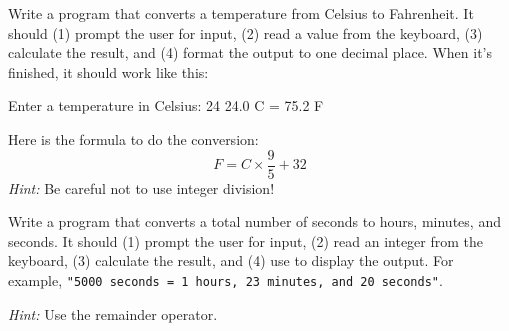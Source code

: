 

\begin{exercise}  %

Write a program that converts a temperature from Celsius to Fahrenheit.
It should (1) prompt the user for input, (2) read a  value from the keyboard, (3) calculate the result, and (4) format the output to one decimal place.
When it's finished, it should work like this:

\begin{stdout}
Enter a temperature in Celsius: 24
24.0 C = 75.2 F
\end{stdout}

Here is the formula to do the conversion:
%
\[ F = C \times \frac{9}{5} + 32 \]
%
{\em Hint:} Be careful not to use integer division!

\end{exercise}


\begin{exercise}  %

Write a program that converts a total number of seconds to hours, minutes, and seconds.
It should (1) prompt the user for input, (2) read an integer from the keyboard, (3) calculate the result, and (4) use  to display the output.
For example, {\tt "5000 seconds = 1 hours, 23 minutes, and 20 seconds"}.

{\em Hint:} Use the remainder operator.

\end{exercise}


